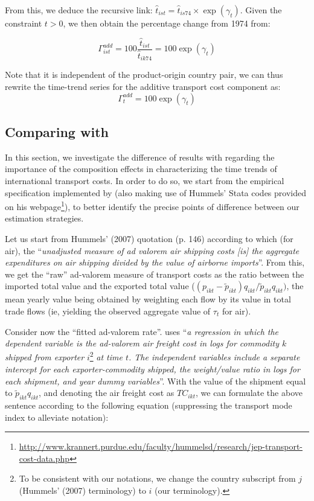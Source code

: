 \documentclass[a4paper,11pt]{article}
\begin{document}
From this, we deduce the recursive link: $\widehat{t}_{ist} = \widehat{t}_{is74} \times \exp(\gamma_t)$.
Given the constraint $t>0$, we then obtain the percentage change from 1974 from:

\begin{equation}
\Gamma^{add}_{ist} = 100\frac{\widehat{t}_{ist}}{\widehat{t}_{ik74}} = 100\exp(\gamma_t) \label{eq:indice_add}
\end{equation}

\noindent Note that it is independent of the product-origin country pair, we can thus rewrite the time-trend series for the additive transport cost component as:
\begin{equation}
\Gamma^{add}_t  = 100\exp(\gamma_t) \label{eq:tcadd_compoeffect}
\end{equation}


\subsection{Comparing with \cite{hummels2007} \label{app:compare_Hummels}}

In this section, we investigate the difference of results with \cite{hummels2007} regarding the importance of the composition effects in characterizing the time trends of international transport costs.
In order to do so, we start from the empirical specification implemented by \cite{hummels2007} (also making use of Hummels' Stata codes provided on his webpage\footnote{\url{http://www.krannert.purdue.edu/faculty/hummelsd/research/jep-transport-cost-data.php}}), to better identify the precise points of difference between our estimation strategies.

Let us start from Hummels' (2007) quotation (p.
146) according to which (for air), the ``\textit{unadjusted measure of ad valorem air shipping costs [is] the aggregate expenditures on air shipping divided by the value of airborne imports}''.
From this, we get the ``raw'' ad-valorem measure of transport costs as the ratio between the imported total value and the exported total value ($(p_{ikt} - \widetilde{p}_{ikt})q_{ikt}/\widetilde{p}_{ikt}q_{ikt})$, the mean yearly value being obtained by weighting each flow by its value in total trade flows (ie, yielding the observed aggregate value of $\tau_t$ for air).

Consider now the ``fitted ad-valorem rate''.
\cite{hummels2007} uses ``\textit{a regression in which the dependent variable is the ad-valorem air freight cost in logs for commodity $k$ shipped from exporter} $i$\footnote{To be consistent with our notations, we change the country subscript from $j$ (Hummels' (2007) terminology) to $i$ (our terminology).} \textit{at time $t$.
The independent variables include a separate intercept for each exporter-commodity shipped, the weight/value ratio in logs for each shipment, and year dummy variables}''.
With the value of the shipment equal to $\widetilde{p}_{ikt}q_{ikt}$, and denoting the air freight cost as $TC_{ikt}$, we can formulate the above sentence according to the following equation (suppressing the transport mode index to alleviate notation):
\end{document}
